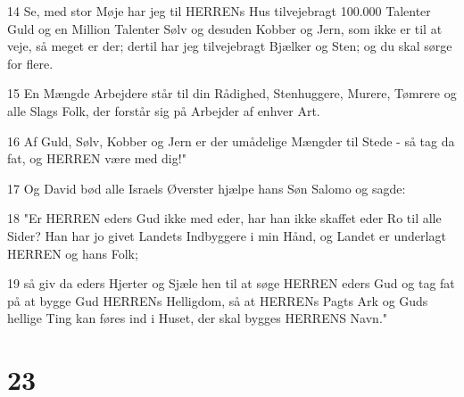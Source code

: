 \par 14 Se, med stor Møje har jeg til HERRENs Hus tilvejebragt 100.000 Talenter Guld og en Million Talenter Sølv og desuden Kobber og Jern, som ikke er til at veje, så meget er der; dertil har jeg tilvejebragt Bjælker og Sten; og du skal sørge for flere.
\par 15 En Mængde Arbejdere står til din Rådighed, Stenhuggere, Murere, Tømrere og alle Slags Folk, der forstår sig på Arbejder af enhver Art.
\par 16 Af Guld, Sølv, Kobber og Jern er der umådelige Mængder til Stede - så tag da fat, og HERREN være med dig!"
\par 17 Og David bød alle Israels Øverster hjælpe hans Søn Salomo og sagde:
\par 18 "Er HERREN eders Gud ikke med eder, har han ikke skaffet eder Ro til alle Sider? Han har jo givet Landets Indbyggere i min Hånd, og Landet er underlagt HERREN og hans Folk;
\par 19 så giv da eders Hjerter og Sjæle hen til at søge HERREN eders Gud og tag fat på at bygge Gud HERRENs Helligdom, så at HERRENs Pagts Ark og Guds hellige Ting kan føres ind i Huset, der skal bygges HERRENS Navn."

\chapter{23}

